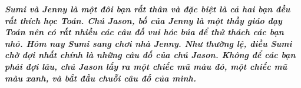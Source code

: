 \centering
\endgroup
\vspace*{150pt}

	\textbf{\color{toancuabi}\textit{Sumi và Jenny là một đôi bạn rất  thân và đặc biệt là cả hai bạn đều rất thích học  Toán. Chú Jason, bố của Jenny là một thầy giáo dạy Toán nên có rất nhiều các câu đố vui hóc búa để thử thách các  bạn nhỏ. 
	\vskip 0.2cm
	Hôm nay Sumi sang chơi nhà Jenny. Như thường lệ, điều Sumi chờ đợi nhất chính là những câu đố của chú Jason.
	\vskip 0.2cm
	Không để các bạn phải đợi lâu, chú Jason lấy ra một chiếc mũ màu đỏ, một chiếc mũ màu xanh, và bắt đầu chuỗi câu đố của mình.}}	

